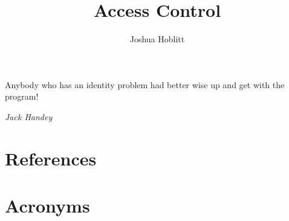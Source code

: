 \documentclass[PMO,authoryear,toc]{lsstdoc}
\title{Access Control}
\author{%
Joshua Hoblitt
}
\date{\vcsDate}
\begin{document}
\maketitle


\epigraph{Anybody who has an identity problem had better wise up and get with the
program!}{\textit{Jack Handey}}

\appendix
\section{References} \label{sec:bib}
\renewcommand{\refname}{} %


\section{Acronyms} \label{sec:acronyms}

\end{document}
